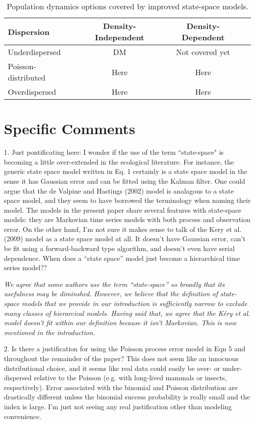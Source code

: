 \documentclass[12pt,english]{article}
\begin{document}
\begin{spacing}{1.9}
\begin{flushleft}
\begin{table}[t]
  \centering
\caption{Population dynamics options covered by improved state-space models.}  
\begin{tabular}{lccc}
    \hline
Dispersion & Density-Independent & Density-Dependent  \\    
\hline
    Underdispersed	        &DM	&Not covered yet  \\
    Poisson-distributed	        &Here	&Here   \\
    Overdispersed		 &Here	&Here    \\
    \hline
  \end{tabular}
\end{table}


\section*{Specific Comments}

1. Just pontificating here: I wonder if the use of the term “state-space" is becoming a little over-extended 
in the ecological literature. For instance, the generic state space model written in Eq. 1 certainly is a 
state space model in the sense it has Gaussian error and can be fitted using the Kalman filter. One could 
argue that the de Valpine and Hastings (2002) model is analagous to a state space model, and they seem 
to have borrowed the terminology when naming their model. The models in the present paper share 
several features with state-space models: they are Markovian time series models with both process and 
observation error. On the other hand, I'm not sure it makes sense to talk of the Kery et al. (2009) model 
as a state space model at all. It doesn't have Gaussian error, can't be fit using a forward-backward type 
algorithm, and doesn't even have serial dependence. When does a “state space” model just become a 
hierarchical time series model??

\textit{We agree that some authors use the term ``state-space'' so broadly that its usefulness may be diminshed. However, we believe that the definition of state-space models that we provide in our introduction is sufficiently narrow to exclude many classes of hierarcical models. Having said that, we agree that the K\'{e}ry et al. model doesn't fit within our definition because it isn't Markovian. This is now mentioned in the introduction.}

2. Is there a justification for using the Poisson process error model in Eqn 5 and throughout the remainder 
of the paper? This does not seem like an innocuous distributional choice, and it seems like real data could 
easily be over- or under-dispersed relative to the Poisson (e.g. with long-lived mammals or insects, respectively). 
Error associated with the binomial and Poisson distribution are drastically different unless the binomial success 
probability is really small and the index is large. I'm just not seeing any real justification other than modeling convenience.


\end{flushleft}
\end{spacing}
\end{document}
